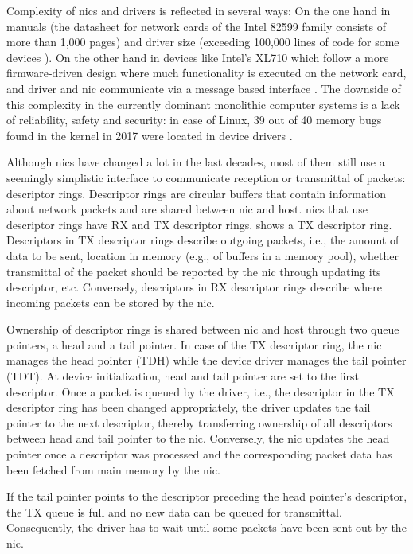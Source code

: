 Complexity of \acp{nic} and drivers is reflected in several ways: On the one
hand in manuals (the datasheet for network cards of the Intel 82599 family
\cite{intel2019datasheet} consists of more than 1,000 pages) and driver size
(exceeding 100,000 lines of code for some devices \cite{emmerich2019case}). On
the other hand in devices like Intel's XL710 which follow a more firmware-driven
design where much functionality is executed on the network card, and driver and
\ac{nic} communicate via a message based interface \cite{emmerich2019user}. The
downside of this complexity in the currently dominant monolithic computer
systems is a lack of reliability, safety and security: in case of Linux, 39 out
of 40 memory bugs found in the kernel in 2017 were located in device drivers
\cite{emmerich2019case}.

Although \acp{nic} have changed a lot in the last decades, most of them still
use a seemingly simplistic interface to communicate reception or transmittal of
packets: descriptor rings. Descriptor rings are circular buffers that contain
information about network packets and are shared between \ac{nic} and host.
\acp{nic} that use descriptor rings have RX and TX descriptor rings.
 shows a TX descriptor ring. Descriptors in TX descriptor
rings describe outgoing packets, i.e., the amount of data to be sent, location
in memory (e.g., of buffers in a memory pool), whether transmittal of the packet
should be reported by the \ac{nic} through updating its descriptor, etc.
Conversely, descriptors in RX descriptor rings describe where incoming packets
can be stored by the \ac{nic}.

Ownership of descriptor rings is shared between \ac{nic} and host through two
queue pointers, a head and a tail pointer. In case of the TX descriptor ring,
the \ac{nic} manages the head pointer (TDH) while the device driver manages the
tail pointer (TDT). At device initialization, head and tail pointer are set to
the first descriptor. Once a packet is queued by the driver, i.e., the
descriptor in the TX descriptor ring has been changed appropriately, the driver
updates the tail pointer to the next descriptor, thereby transferring ownership
of all descriptors between head and tail pointer to the \ac{nic}. Conversely,
the \ac{nic} updates the head pointer once a descriptor was processed and the
corresponding packet data has been fetched from main memory by the \ac{nic}.

If the tail pointer points to the descriptor preceding the head pointer's
descriptor, the TX queue is full and no new data can be queued for transmittal.
Consequently, the driver has to wait until some packets have been sent out by
the \ac{nic}.



